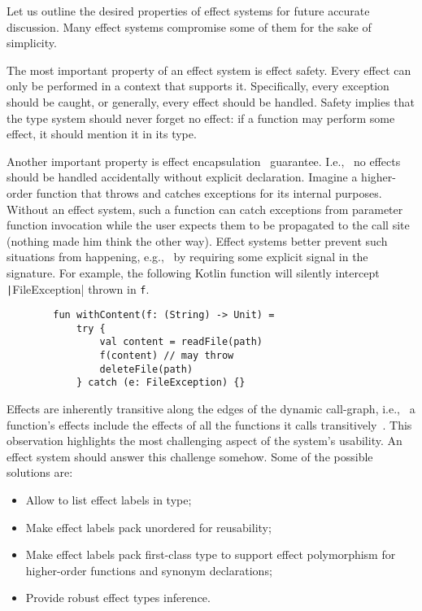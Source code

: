 \documentclass[conference]{IEEEtran}
\begin{document}
    Let us outline the desired properties of effect systems for future accurate discussion.
    Many effect systems compromise some of them for the sake of simplicity.

    The most important property of an effect system is effect safety.
    Every effect can only be performed in a context that supports it.
    Specifically, every exception should be caught, or generally, every effect should be handled.
    Safety implies that the type system should never forget no effect: if a function may perform some effect, it should mention it in its type.

    Another important property is effect encapsulation~\cite{lindley2018encapsulating} guarantee.
    I.e., \ no effects should be handled accidentally without explicit declaration.
    Imagine a higher-order function that throws and catches exceptions for its internal purposes.
    Without an effect system, such a function can catch exceptions from parameter function invocation while the user expects them to be propagated to the call site (nothing made him think the other way).
    Effect systems better prevent such situations from happening, e.g., \, by requiring some explicit signal in the signature.
    For example, the following Kotlin function will silently intercept \texttt|FileException| thrown in \texttt{f}.
    \begin{verbatim}
        fun withContent(f: (String) -> Unit) =
            try {
                val content = readFile(path)
                f(content) // may throw
                deleteFile(path)
            } catch (e: FileException) {}
    \end{verbatim}

    Effects are inherently transitive along the edges of the dynamic call-graph, i.e., \ a function's effects include the effects of all the functions it calls transitively~\cite{odersky2022scoped}.
    This observation highlights the most challenging aspect of the system's usability.
    An effect system should answer this challenge somehow.
    Some of the possible solutions are:
    \begin{itemize}
        \item Allow to list effect labels in type;
        \item Make effect labels pack unordered for reusability;
        \item Make effect labels pack first-class type to support effect polymorphism for higher-order functions and synonym declarations;
        \item Provide robust effect types inference.
    \end{itemize}
\end{document}
